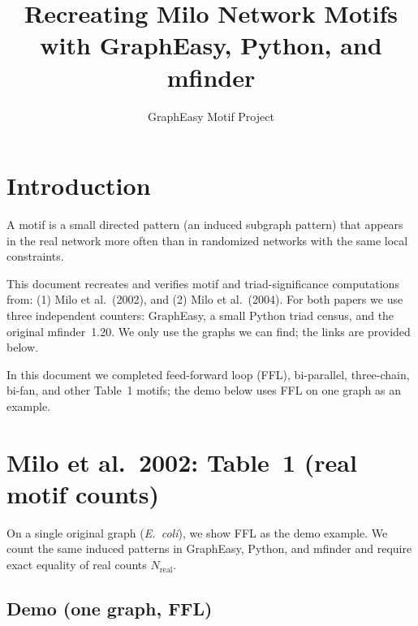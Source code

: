 \documentclass[11pt]{article}
\title{Recreating Milo Network Motifs\\
\large with GraphEasy, Python, and mfinder}
\author{GraphEasy Motif Project}
\date{}
\begin{document}
\maketitle
\section{Introduction}

A motif is a small directed pattern (an induced subgraph pattern) that appears in the real network more often than in randomized networks with the same local constraints.

This document recreates and verifies motif and triad-significance computations from:
(1) Milo et al.\ (2002), and
(2) Milo et al.\ (2004).
For both papers we use three independent counters:
GraphEasy, a small Python triad census, and the original mfinder~1.20.
We only use the graphs we can find; the links are provided below.

In this document we completed feed-forward loop (FFL), bi-parallel, three-chain, bi-fan, and other Table~1 motifs; the demo below uses FFL on one graph as an example.

\section{Milo et al.\ 2002: Table~1 (real motif counts)}

On a single original graph (\textit{E.\ coli}), we show FFL as the demo example.
We count the same induced patterns in GraphEasy, Python, and mfinder and require exact equality of real counts $N_{\mathrm{real}}$.

\subsection*{Demo (one graph, FFL)}
\end{document}
